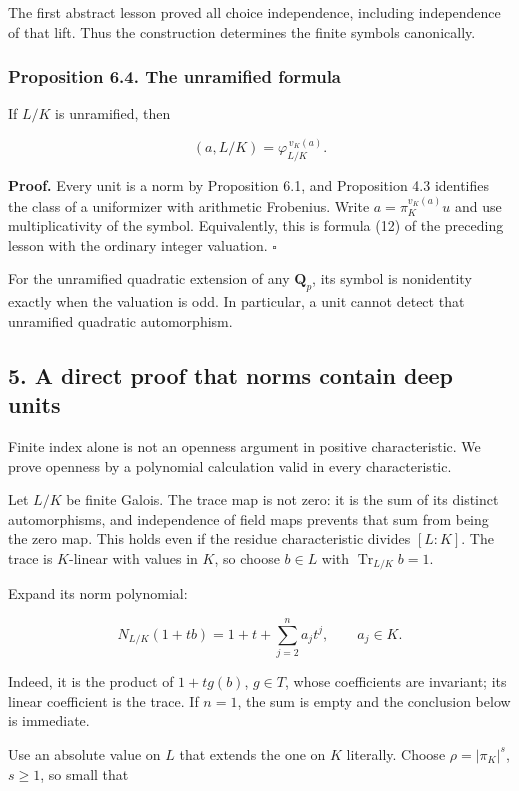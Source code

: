 \documentclass[11pt,a4paper]{article}
\begin{document}
The first abstract lesson proved all choice independence, including
independence of that lift. Thus the construction determines the finite
symbols canonically.

\subsubsection{Proposition 6.4. The unramified
formula}\label{proposition-6.4.-the-unramified-formula}

If \(L/K\) is unramified, then

\[
(a,L/K)=\varphi_{L/K}^{\,v_K(a)}.
\tag{12}
\]

\textbf{Proof.} Every unit is a norm by Proposition 6.1, and Proposition
4.3 identifies the class of a uniformizer with arithmetic Frobenius.
Write \(a=\pi_K^{v_K(a)}u\) and use multiplicativity of the symbol.
Equivalently, this is formula (12) of the preceding lesson with the
ordinary integer valuation. \(\square\)

For the unramified quadratic extension of any \(\mathbf Q_p\), its
symbol is nonidentity exactly when the valuation is odd. In particular,
a unit cannot detect that unramified quadratic automorphism.

\subsection{5. A direct proof that norms contain deep
units}\label{a-direct-proof-that-norms-contain-deep-units}

Finite index alone is not an openness argument in positive
characteristic. We prove openness by a polynomial calculation valid in
every characteristic.

Let \(L/K\) be finite Galois. The trace map is not zero: it is the sum
of its distinct automorphisms, and independence of field maps prevents
that sum from being the zero map. This holds even if the residue
characteristic divides \([L:K]\). The trace is \(K\)-linear with values
in \(K\), so choose \(b\in L\) with \(\operatorname{Tr}_{L/K}b=1\).

Expand its norm polynomial:

\[
N_{L/K}(1+tb)=1+t+\sum_{j=2}^n a_jt^j,
\qquad a_j\in K.
\tag{13}
\]

Indeed, it is the product of \(1+t g(b)\), \(g\in T\), whose
coefficients are invariant; its linear coefficient is the trace. If
\(n=1\), the sum is empty and the conclusion below is immediate.

Use an absolute value on \(L\) that extends the one on \(K\) literally.
Choose \(\rho=|\pi_K|^s\), \(s\geq1\), so small that
\end{document}
